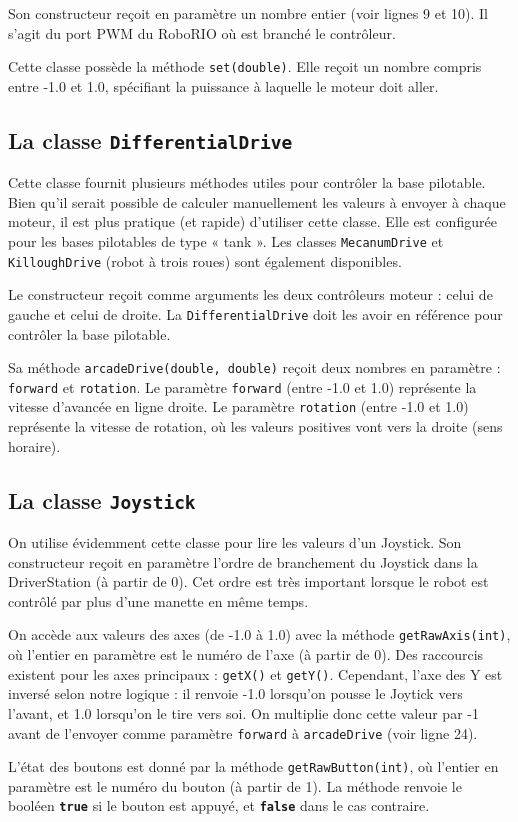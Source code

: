 \documentclass[12pt]{report}
\begin{document}
Son constructeur reçoit en paramètre un nombre entier (voir lignes 9 et 10). Il s'agit du port PWM du RoboRIO où est branché le contrôleur.

Cette classe possède la méthode \texttt{set(double)}. Elle reçoit un nombre compris entre -1.0 et 1.0, spécifiant la puissance à laquelle le moteur doit aller.

\subsection{La classe \texttt{DifferentialDrive}}

Cette classe fournit plusieurs méthodes utiles pour contrôler la base pilotable. Bien qu'il serait possible de calculer manuellement les valeurs à envoyer à chaque moteur, il est plus pratique (et rapide) d'utiliser cette classe. Elle est configurée pour les bases pilotables de type « tank ». Les classes \texttt{MecanumDrive} et \texttt{KilloughDrive} (robot à trois roues) sont également disponibles.

Le constructeur reçoit comme arguments les deux contrôleurs moteur : celui de gauche et celui de droite. La \texttt{DifferentialDrive} doit les avoir en référence pour contrôler la base pilotable.

Sa méthode \texttt{arcadeDrive(double, double)} reçoit deux nombres en paramètre : \texttt{forward} et \texttt{rotation}. Le paramètre \texttt{forward} (entre -1.0 et 1.0) représente la vitesse d'avancée en ligne droite. Le paramètre \texttt{rotation} (entre -1.0 et 1.0) représente la vitesse de rotation, où les valeurs positives vont vers la droite (sens horaire). 

\subsection{La classe \texttt{Joystick}}

On utilise évidemment cette classe pour lire les valeurs d'un Joystick. Son constructeur reçoit en paramètre l'ordre de branchement du Joystick dans la DriverStation (à partir de 0). Cet ordre est très important lorsque le robot est contrôlé par plus d'une manette en même temps.

On accède aux valeurs des axes (de -1.0 à 1.0) avec la méthode \texttt{getRawAxis(int)}, où l'entier en paramètre est le numéro de l'axe (à partir de 0). Des raccourcis existent pour les axes principaux : \texttt{getX()} et \texttt{getY()}. Cependant, l'axe des Y est inversé selon notre logique : il renvoie -1.0 lorsqu'on pousse le Joytick vers l'avant, et 1.0 lorsqu'on le tire vers soi. On multiplie donc cette valeur par -1 avant de l'envoyer comme paramètre \texttt{forward} à \texttt{arcadeDrive} (voir ligne 24).

L'état des boutons est donné par la méthode \texttt{getRawButton(int)}, où l'entier en paramètre est le numéro du bouton (à partir de 1). La méthode renvoie le booléen \texttt{\bfseries true} si le bouton est appuyé, et \texttt{\bfseries false} dans le cas contraire.
\end{document}
